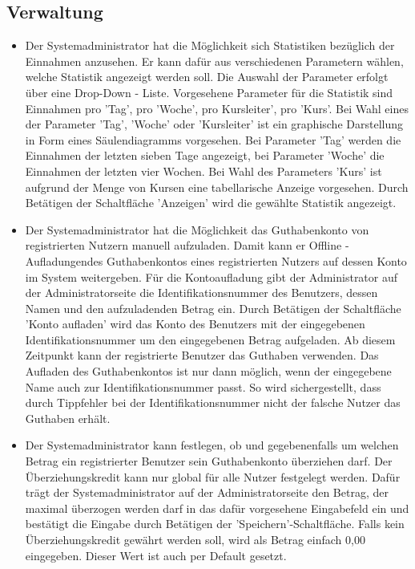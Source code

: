 \documentclass[a4paper]{scrreprt}
\begin{document}
		\subsection{Verwaltung}
			\begin{itemize}
				\item {}
					Der Systemadministrator hat die Möglichkeit sich Statistiken bezüglich der Einnahmen anzusehen. Er kann dafür aus 	verschiedenen Parametern wählen, welche Statistik angezeigt werden soll. Die Auswahl der Parameter erfolgt über eine Drop-Down - Liste. Vorgesehene Parameter für die Statistik sind Einnahmen pro 'Tag', pro 'Woche', pro Kursleiter', pro 'Kurs'. Bei Wahl eines der Parameter 'Tag', 'Woche' oder 'Kursleiter' ist ein graphische Darstellung in Form eines Säulendiagramms vorgesehen. Bei Parameter 'Tag' werden die Einnahmen der letzten sieben Tage angezeigt, bei Parameter 'Woche' die Einnahmen der letzten vier Wochen. Bei Wahl des Parameters 'Kurs' ist aufgrund der Menge von Kursen eine tabellarische Anzeige vorgesehen. Durch Betätigen der Schaltfläche 'Anzeigen' wird die gewählte Statistik angezeigt.
				\item {}
					Der Systemadministrator hat die Möglichkeit das Guthabenkonto von  registrierten Nutzern manuell aufzuladen. Damit kann er \glqq Offline - Aufladungen\grqq  des Guthabenkontos eines registrierten Nutzers auf dessen Konto im System weitergeben. Für die Kontoaufladung gibt der Administrator auf der Administratorseite die Identifikationsnummer des Benutzers, dessen Namen und den aufzuladenden Betrag ein. Durch Betätigen der Schaltfläche 'Konto aufladen' wird das Konto des Benutzers mit der eingegebenen Identifikationsnummer um den eingegebenen Betrag aufgeladen. Ab diesem Zeitpunkt kann der registrierte Benutzer das Guthaben verwenden. Das Aufladen des Guthabenkontos ist nur dann möglich, wenn der eingegebene Name auch zur Identifikationsnummer passt. So wird sichergestellt, dass durch Tippfehler bei der Identifikationsnummer nicht der falsche Nutzer das Guthaben erhält.
				\item {}
					Der Systemadministrator kann festlegen, ob und gegebenenfalls um welchen Betrag ein registrierter Benutzer sein Guthabenkonto überziehen darf. Der Überziehungskredit kann nur global für alle Nutzer festgelegt werden. Dafür trägt der Systemadministrator auf der Administratorseite den Betrag, der maximal überzogen werden darf in das dafür vorgesehene Eingabefeld ein und bestätigt die Eingabe durch Betätigen der 'Speichern'-Schaltfläche.
					Falls kein Überziehungskredit gewährt werden soll, wird als Betrag einfach 0,00 eingegeben. Dieser Wert ist auch per Default gesetzt.
			\end{itemize}
			
\end{document}
